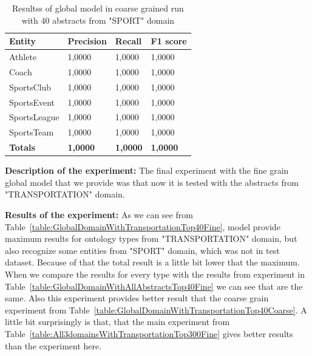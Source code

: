 \documentclass[thesis=M,english]{FITthesis}[2018/05/30]
\begin{document}
	\begin{table}[H]\centering
		\begin{tabular}{|l|l|l|l|}
			\hline {\textbf{Entity}} & {\textbf{Precision}} & {\textbf{Recall}} & {\textbf{F1 score}}\\\hline
				Athlete & 1,0000 & 1,0000 & 1,0000\\
				Coach & 1,0000 & 1,0000 & 1,0000\\
				SportsClub & 1,0000 & 1,0000 & 1,0000\\
				SportsEvent & 1,0000 & 1,0000 & 1,0000\\
				SportsLeague & 1,0000 & 1,0000 & 1,0000\\
				SportsTeam & 1,0000 & 1,0000 & 1,0000\\\hline
				\textbf{Totals} & \textbf{1,0000} & \textbf{1,0000} & \textbf{1,0000}\\\hline
		\end{tabular}
		\caption{Resultss of global model in coarse grained run with 40 abstracts from "SPORT" domain \label{table:GlobalDomainWithSportTop40Fine}}
	\end{table}	


	\textbf{Description of the experiment:} The final experiment with the fine grain global model that we provide was that now it is tested with the abstracts from "TRANSPORTATION" domain.

	\textbf{Results of the experiment:} As we can see from Table~\ref{table:GlobalDomainWithTransportationTop40Fine}, model provide maximum results for ontology types from "TRANSPORTATION" domain, but also recognize some entities from "SPORT" domain, which was not in test dataset. Because of that the total result is a little bit lower that the maximum. When we compare the results for every type with the results from experiment in Table~\ref{table:GlobalDomainWithAllAbstractsTop40Fine} we can see that are the same. Also this experiment provides better result that the coarse grain experiment from Table~\ref{table:GlobalDomainWithTransportationTop40Coarse}. A little bit surprisingly is that, that the main experiment from Table~\ref{table:All3domainsWithTransportationTop300Fine} gives better results than the experiment here.   
\end{document}
